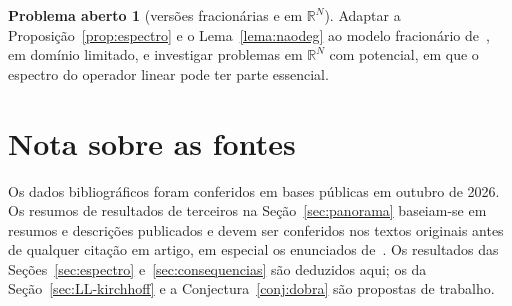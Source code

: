 \documentclass[11pt,a4paper]{article}
\theoremstyle{plain}
\theoremstyle{definition}
\newtheorem{problema}{Problema aberto}
\theoremstyle{remark}
\newcommand{\R}{\mathbb{R}}
\begin{document}
\begin{problema}[versões fracionárias e em $\R^N$]
Adaptar a Proposição~\ref{prop:espectro} e o Lema~\ref{lema:naodeg} ao modelo
fracionário de~\cite{FiscellaValdinoci2014}, em domínio limitado, e investigar
problemas em $\R^N$ com potencial, em que o espectro do operador linear pode ter
parte essencial.
\end{problema}

\section*{Nota sobre as fontes}

Os dados bibliográficos foram conferidos em bases públicas em outubro de 2026.
Os resumos de resultados de terceiros na Seção~\ref{sec:panorama} baseiam-se em
resumos e descrições publicados e devem ser conferidos nos textos originais
antes de qualquer citação em artigo, em especial os enunciados
de~\cite{SunTang2013,BensedikBouchekif2009,ChenKuoWu2011,RezendeSanchezSilva2019}.
Os resultados das Seções~\ref{sec:espectro} e~\ref{sec:consequencias} são
deduzidos aqui; os da Seção~\ref{sec:LL-kirchhoff} e a
Conjectura~\ref{conj:dobra} são propostas de trabalho.



\end{document}
